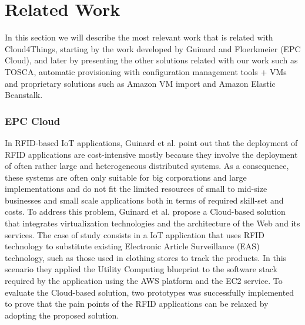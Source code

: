 \documentclass{../llncs2e/llncs}
\begin{document}
\section{Related Work}
\label{sec:related_work}
In this section we will describe the most relevant work that is related with Cloud4Things, starting
by the work developed by Guinard and Floerkmeier (EPC Cloud), and later by presenting the other
solutions related with our work such as TOSCA, automatic provisioning with configuration management
tools + VMs and proprietary solutions such as Amazon VM import and Amazon Elastic Beanstalk.

\subsubsection{EPC Cloud}
\label{subs:epc-cloud}
In RFID-based IoT applications, Guinard et al. \cite{guinard2011cloud} point out that the
deployment of RFID applications are cost-intensive mostly because they involve the
deployment of often rather large and heterogeneous distributed systems. As a consequence,
these systems are often only suitable for big corporations and large implementations and
do not fit the limited resources of small to mid-size businesses and small scale applications
both in terms of required skill-set and costs. To address this problem, Guinard et al. propose
a Cloud-based solution that integrates virtualization technologies and the architecture of
the Web and its services. The case of study consists in a IoT application that uses RFID technology
to substitute existing Electronic Article Surveillance (EAS) technology, such as those used in
clothing stores to track the products. In this scenario they applied the Utility Computing blueprint
to the software stack required by the application using the AWS platform and the EC2 service. To
evaluate the Cloud-based solution, two prototypes was successfully implemented to prove that
the pain points of the RFID applications can be relaxed by adopting the proposed solution.\\

\end{document}
